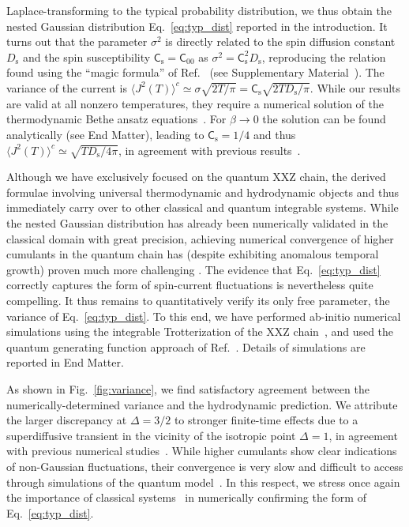 \documentclass[
twocolumn,
amsfonts,
showpacs,
superscriptaddress,
amsmath,
amssymb,
aps,
longbibliography,
prl,
noeprint
]{revtex4-2}
\newcommand{\ch}[1]{{\color{black}  #1}}
\newcounter{ls}
\newcommand{\1}{{\bf 1}}
\begin{document}
Laplace-transforming to the typical probability distribution, we thus obtain the nested Gaussian distribution Eq.~\eqref{eq:typ_dist} reported in the introduction.
It turns out that the parameter $\sigma^2$ is directly related to the spin diffusion constant $D_\mathrm{s}$ and the spin susceptibility $\mathsf{C}_\mathrm{s}=\mathsf{C}_{00}$ as $\sigma^2=\mathsf{C}_\mathrm{s}^2D_\mathrm{s}$, reproducing the relation found using the ``magic formula'' of Ref.~\cite{DeNardis2019} (see Supplementary Material~\cite{SM}).
The variance of the current is $\langle J^2(T)\rangle^c
 \simeq \sigma \sqrt{2T/\pi}=\mathsf{C}_\mathrm{s}\sqrt{2TD_\mathrm{s}/\pi}$.
 \ch{While our results are valid at all nonzero temperatures, they require a numerical solution of the thermodynamic Bethe ansatz equations~\cite{Takahashi1999}. For $\beta\to 0$ the solution can be found analytically (see End Matter), leading to $\mathsf{C}_\mathrm{s}=1/4$ and thus $\langle J^2(T)\rangle^c \simeq \sqrt{TD_\mathrm{s}/4\pi}$, in agreement with previous results~\cite{SarangKhemani2024}.}

\ch{Although we have exclusively focused on the quantum XXZ chain, the derived formulae involving universal thermodynamic and hydrodynamic objects and thus immediately carry over to other classical and quantum integrable systems. While the nested Gaussian distribution has already been numerically validated in the classical domain \cite{Krajnik2024_1} with great precision, achieving numerical convergence of higher cumulants in the quantum chain has (despite exhibiting anomalous temporal growth) proven much more challenging \cite{Valli_2025,Yadalam2026}. The evidence that Eq.~\eqref{eq:typ_dist} correctly captures the form of spin-current fluctuations is nevertheless quite compelling. It thus remains to quantitatively verify its only free parameter, the variance of Eq.~\eqref{eq:typ_dist}.} To this end, we have performed ab-initio numerical simulations using the integrable Trotterization of the XXZ chain~\cite{Vanicat2017,Ljubotina2019}, and used the quantum generating function approach of Ref.~\cite{Valli_2025}. Details of simulations are reported in End Matter.

As shown in Fig.~\ref{fig:variance}, we find satisfactory agreement between the numerically-determined variance and the hydrodynamic prediction. We attribute the larger discrepancy at $\Delta = 3/2$ to stronger finite-time effects due to a superdiffusive transient in the vicinity of the isotropic point $\Delta =1$, in agreement with previous numerical studies~\cite{Prelovsek1,Sirker,Langer,Karrasch2014,BertiniReview2021}.
While higher cumulants show clear indications of non-Gaussian fluctuations, their convergence is very slow and difficult to access through simulations of the quantum model~\cite{Valli_2025,Yadalam2026}. In this respect, we stress once again the importance of classical systems~\cite{Krajnik2024_1} in numerically confirming the form of Eq.~\eqref{eq:typ_dist}.
\end{document}
